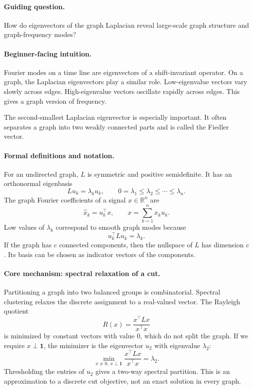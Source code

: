 \paragraph{Guiding question.}
How do eigenvectors of the graph Laplacian reveal large-scale graph structure and graph-frequency modes?

\paragraph{Beginner-facing intuition.}
Fourier modes on a time line are eigenvectors of a shift-invariant operator. On a graph, the Laplacian eigenvectors play a similar role. Low-eigenvalue vectors vary slowly across edges. High-eigenvalue vectors oscillate rapidly across edges. This gives a graph version of frequency.

The second-smallest Laplacian eigenvector is especially important. It often separates a graph into two weakly connected parts and is called the Fiedler vector.

\paragraph{Formal definitions and notation.}
For an undirected graph, \(L\) is symmetric and positive semidefinite. It has an orthonormal eigenbasis
\[
Lu_k=\lambda_k u_k,\qquad
0=\lambda_1\leq\lambda_2\leq\cdots\leq\lambda_n.
\]
The graph Fourier coefficients of a signal \(x\in\mathbb R^n\) are
\[
\widehat x_k=u_k^\top x,
\qquad
x=\sum_{k=1}^n \widehat x_k u_k.
\]
Low values of \(\lambda_k\) correspond to smooth graph modes because
\[
u_k^\top L u_k=\lambda_k.
\]
If the graph has \(c\) connected components, then the nullspace of \(L\) has dimension \(c\). Its basis can be chosen as indicator vectors of the components.

\paragraph{Core mechanism: spectral relaxation of a cut.}
Partitioning a graph into two balanced groups is combinatorial. Spectral clustering relaxes the discrete assignment to a real-valued vector. The Rayleigh quotient
\[
R(x)=\frac{x^\top Lx}{x^\top x}
\]
is minimized by constant vectors with value \(0\), which do not split the graph. If we require \(x\perp\mathbf 1\), the minimizer is the eigenvector \(u_2\) with eigenvalue \(\lambda_2\):
\[
\min_{x\neq0,\ x\perp\mathbf 1}\frac{x^\top Lx}{x^\top x}=\lambda_2.
\]
Thresholding the entries of \(u_2\) gives a two-way spectral partition. This is an approximation to a discrete cut objective, not an exact solution in every graph.

